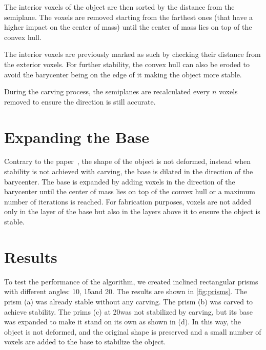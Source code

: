 \documentclass[tikz,10pt,fleqn]{article}
\begin{document}
The interior voxels of the object are then sorted by the distance from the semiplane. The voxels are removed starting from the farthest ones (that have a higher impact on the center of mass) until the center of mass lies on top of the convex hull. 

The interior voxels are previously marked as such by checking their distance from the exterior voxels. For further stability, the convex hull can also be eroded to avoid the barycenter being on the edge of it making the object more stable.

During the carving process, the semiplanes are recalculated every $n$ voxels removed to ensure the direction is still accurate.

\section{Expanding the Base}
Contrary to the paper~\cite{Pevost:2013:MIS}, the shape of the object is not deformed, instead when stability is not achieved with carving, the base is dilated in the direction of the barycenter. The base is expanded by adding voxels in the direction of the barycenter until the center of mass lies on top of the convex hull or a maximum number of iterations is reached. For fabrication purposes, voxels are not added only in the layer of the base but also in the layers above it to ensure the object is stable.

\section{Results}
To test the performance of the algorithm, we created inclined rectangular prisms with different angles: 10\degree, 15\degree and 20\degree. The results are shown in \autoref{fig:prisms}.
The prism (a) was already stable without any carving. The prism (b) was carved to achieve stability. The prims (c) at 20\degree was not stabilized by carving, but its base was expanded to make it stand on its own as shown in (d). In this way, the object is not deformed, and the original shape is preserved and a small number of voxels are added to the base to stabilize the object.
\end{document}
